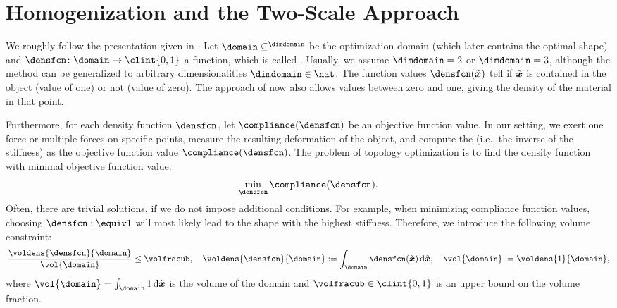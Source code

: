 \section{Homogenization and the Two-Scale Approach}
\label{sec:61homogenization}

We roughly follow the presentation given in
.
Let $\domain \subset \real^\dimdomain$ be the optimization domain
(which later contains the optimal shape) and
$\densfcn\colon \domain \to \clint{0, 1}$ a function,
which is called .
Usually, we assume $\dimdomain = 2$ or $\dimdomain = 3$,
although the method can be generalized to
arbitrary dimensionalities $\dimdomain \in \nat$.
The function values $\densfcn(\tilde{\*x})$ tell if $\tilde{{\boldsymbol{x}}}$
is contained in the object (value of one) or not (value of zero).
The approach of  now also allows values between
zero and one, giving the density of the material in that point.

Furthermore, for each density function $\densfcn$,
let $\compliance(\densfcn)$ be an objective function value.
In our setting,
we exert one force or multiple forces on specific points,
measure the resulting deformation of the object, and
compute the  (i.e., the inverse of the stiffness) as
the objective function value $\compliance(\densfcn)$.
The problem of topology optimization is to find the density function
with minimal objective function value:
\begin{equation}
  \label{eq:topoOptProblemContinuous}
  \min_{\densfcn} \compliance(\densfcn).
\end{equation}
Often, there are trivial solutions, if we do not impose additional conditions.
For example, when minimizing compliance function values,
choosing $\densfcn :\equiv 1$ will most likely lead to the shape with the
highest stiffness.
Therefore, we introduce the following volume constraint:
\begin{equation}
  \frac{\voldens{\densfcn}{\domain}}{\vol{\domain}} \le \volfracub,\quad
  \voldens{\densfcn}{\domain}
  := \int_{\domain} \densfcn(\tilde{\*x}) \diff\tilde{\*x},\quad
  \vol{\domain}
  := \voldens{1}{\domain},
\end{equation}
where $\vol{\domain} = \int_{\domain} 1 \diff\tilde{\*x}$
is the volume of the domain and
$\volfracub \in \clint{0, 1}$ is an upper bound on the volume fraction.

